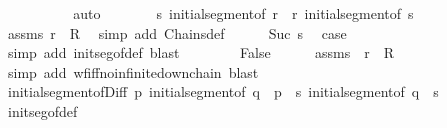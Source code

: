 \begin{isabellebody}
\ \ \ \ \ \ \isamarkupfalse%
\ {}\ \isamarkupfalse%
\ auto\isanewline
\ \ \ \ \isamarkupfalse%
\ \isamarkupfalse%
\ {\isachardoublequoteopen}s\ initial{\isacharunderscore}{\kern0pt}segment{\isacharunderscore}{\kern0pt}of\ r\ {\isasymor}\ r\ initial{\isacharunderscore}{\kern0pt}segment{\isacharunderscore}{\kern0pt}of\ s{\isachardoublequoteclose}\isanewline
\ \ \ \ \ \ \isamarkupfalse%
\ assms{\isacharparenleft}{\kern0pt}{}{\isacharparenright}{\kern0pt}\ {\isacartoucheopen}r\ {\isasymin}\ R{\isacartoucheclose}\ \isamarkupfalse%
\ {\isacharparenleft}{\kern0pt}simp\ add{\isacharcolon}{\kern0pt}\ Chains{\isacharunderscore}{\kern0pt}def{\isacharparenright}{\kern0pt}\isanewline
\ \ \ \ \isamarkupfalse%
\ Suc\ s\ \isamarkupfalse%
\ {\isacharquery}{\kern0pt}case\ \isamarkupfalse%
\ {\isacharparenleft}{\kern0pt}simp\ add{\isacharcolon}{\kern0pt}\ init{\isacharunderscore}{\kern0pt}seg{\isacharunderscore}{\kern0pt}of{\isacharunderscore}{\kern0pt}def{\isacharparenright}{\kern0pt}\ blast\isanewline
\ \ \isamarkupfalse%
\isanewline
\ \ \isamarkupfalse%
\ \isamarkupfalse%
\ False\isanewline
\ \ \ \ \isamarkupfalse%
\ assms{\isacharparenleft}{\kern0pt}{}{\isacharparenright}{\kern0pt}\ \ {\isacartoucheopen}r\ {\isasymin}\ R{\isacartoucheclose}\isanewline
\ \ \ \ \isamarkupfalse%
\ {\isacharparenleft}{\kern0pt}simp\ add{\isacharcolon}{\kern0pt}\ wf{\isacharunderscore}{\kern0pt}iff{\isacharunderscore}{\kern0pt}no{\isacharunderscore}{\kern0pt}infinite{\isacharunderscore}{\kern0pt}down{\isacharunderscore}{\kern0pt}chain{\isacharparenright}{\kern0pt}\ blast\isanewline
{}\isamarkupfalse%
%
\endisatagproof
{\isafoldproof}%
%
\isadelimproof
\isanewline
%
\endisadelimproof
\isanewline
{}\isamarkupfalse%
\ initial{\isacharunderscore}{\kern0pt}segment{\isacharunderscore}{\kern0pt}of{\isacharunderscore}{\kern0pt}Diff{\isacharcolon}{\kern0pt}\ {\isachardoublequoteopen}p\ initial{\isacharunderscore}{\kern0pt}segment{\isacharunderscore}{\kern0pt}of\ q\ {\isasymLongrightarrow}\ p\ {\isacharminus}{\kern0pt}\ s\ initial{\isacharunderscore}{\kern0pt}segment{\isacharunderscore}{\kern0pt}of\ q\ {\isacharminus}{\kern0pt}\ s{\isachardoublequoteclose}\isanewline
%
\isadelimproof
\ \ %
\endisadelimproof
%
\isatagproof
{}\isamarkupfalse%
\ init{\isacharunderscore}{\kern0pt}seg{\isacharunderscore}{\kern0pt}of{\isacharunderscore}{\kern0pt}def\ \isamarkupfalse%

\end{isabellebody}
